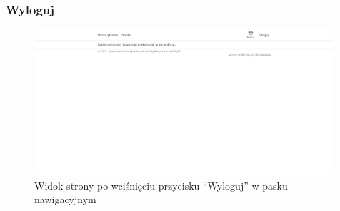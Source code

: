 \documentclass{article}
\begin{document}
\subsubsection{Wyloguj}
\begin{figure}[H]
   \centering
   \includegraphics[width=0.99\textwidth,frame]{Wyglad/wylogowanie_admin.png}
   \caption{Widok strony po wciśnięciu przycisku ``Wyloguj'' w pasku nawigacyjnym}
\end{figure}
\end{document}
